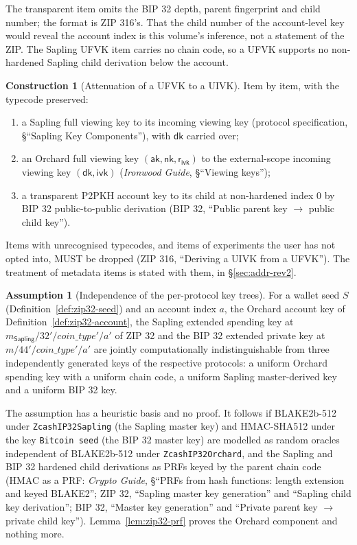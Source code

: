 \documentclass[11pt,a4paper]{article}
\theoremstyle{definition}
\newtheorem{construction}[theorem]{Construction}
\newtheorem{assumption}[theorem]{Assumption}
\newcommand{\aksym}{\ensuremath{\mathsf{ak}}}
\newcommand{\nksym}{\ensuremath{\mathsf{nk}}}
\newcommand{\ivk}{\ensuremath{\mathsf{ivk}}}
\newcommand{\dk}{\ensuremath{\mathsf{dk}}}
\newcommand{\rivk}{\ensuremath{\mathsf{r_{ivk}}}}
\begin{document}
The transparent item omits the BIP 32 depth, parent fingerprint and child
number; the format is ZIP 316's. That the child number of the account-level
key would reveal the account index is this volume's inference, not a
statement of the ZIP. The Sapling UFVK item carries no chain code, so a UFVK
supports no non-hardened Sapling child derivation below the account.

\begin{construction}[Attenuation of a UFVK to a UIVK]\label{def:addr-attenuate}
Item by item, with the typecode preserved:
\begin{enumerate}
\item a Sapling full viewing key to its incoming viewing key (protocol
  specification, \S``Sapling Key Components''), with $\dk$ carried over;
\item an Orchard full viewing key $(\aksym, \nksym, \rivk)$ to the
  external-scope incoming viewing key $(\dk, \ivk)$ (\emph{Ironwood Guide},
  \S``Viewing keys'');
\item a transparent P2PKH account key to its child at non-hardened index $0$
  by BIP 32 public-to-public derivation (BIP 32, ``Public parent key $\to$
  public child key'').
\end{enumerate}
Items with unrecognised typecodes, and items of experiments the user has
not opted into, MUST be dropped (ZIP 316, ``Deriving a UIVK from a
UFVK''). The treatment of metadata items is stated with them, in
\S\ref{sec:addr-rev2}.
\end{construction}

\begin{assumption}[Independence of the per-protocol key trees]%
\label{ass:addr-trees}
For a wallet seed $S$ (Definition~\ref{def:zip32-seed}) and an account
index $a$, the Orchard account key of Definition~\ref{def:zip32-account},
the Sapling extended spending key at $m_{\mathsf{Sapling}}/32'/
\mathit{coin\_type}'/a'$ of ZIP 32 and the BIP 32 extended private key at
$m/44'/\mathit{coin\_type}'/a'$ are jointly computationally
indistinguishable from three independently generated keys of the respective
protocols: a uniform Orchard spending key with a uniform chain code, a
uniform Sapling master-derived key and a uniform BIP 32 key.
\end{assumption}

The assumption has a heuristic basis and no proof. It follows if
BLAKE2b-512 under \texttt{ZcashIP32Sapling} (the Sapling master key) and
HMAC-SHA512 under the key \texttt{Bitcoin seed} (the BIP 32 master key) are
modelled as random oracles independent of BLAKE2b-512 under
\texttt{ZcashIP32Orchard}, and the Sapling and BIP 32 hardened child
derivations as PRFs keyed by the parent chain code (HMAC as a PRF:
\emph{Crypto Guide}, \S``PRFs from hash functions: length extension and
keyed BLAKE2''; ZIP 32, ``Sapling master key generation'' and ``Sapling
child key derivation''; BIP 32, ``Master key generation'' and ``Private
parent key $\to$ private child key''). Lemma~\ref{lem:zip32-prf} proves the
Orchard component and nothing more.
\end{document}
